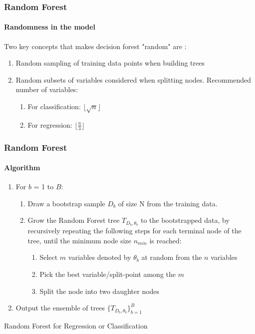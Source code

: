\begin{frame}
\frametitle{Random Forest}
\framesubtitle{Randomness in the model}

Two key concepts that makes decision forest "random" are \cite{friedman2001elements}:
\vspace{1ex}
\begin{enumerate}
	\item Random sampling of training data points when building trees
\vspace{1ex}
	\item Random subsets of variables considered when splitting nodes. Recommended number of variables:
\vspace{1ex}
	\begin{enumerate}[a]
	    \item For classification:  $\lfloor{\sqrt{n}} \rfloor$
\vspace{1ex}
	    \item For regression: $\lfloor \frac{n}{3} \rfloor$
	\end{enumerate}
\end{enumerate}


\end{frame}

\begin{frame}
\frametitle{Random Forest}
\framesubtitle{Algorithm}

\begin{algorithm}[H]
\SetAlgoLined
\begin{enumerate}
	\bigbreak
	\item For $b$ = 1 to $B$:
	\begin{enumerate}[a]
	    \item Draw a bootstrap sample $D_{b}$ of size N from the training data.
	    \item Grow the Random Forest tree ${{T}_{D_{b},\theta_{b}}}$ to the bootstrapped data, by recursively repeating the following steps for each terminal node of the tree, until the minimum node size $n_{min}$ is reached:
	    \begin{enumerate}[i]
	       \item Select $m$ variables denoted by $\theta_{b}$ at random from the $n$ variables
	       \item Pick the best variable/split-point among the $m$
	       \item  Split the node into two daughter nodes
	    \end{enumerate}
	\end{enumerate}
	\item  Output the ensemble of trees $\{{T}_{D_{b},\theta_{b}}\}_{b=1}^{B}$
	\smallbreak
\end{enumerate}
 \caption{Random Forest for Regression or Classification \cite{friedman2001elements}}
\end{algorithm}

\end{frame}















